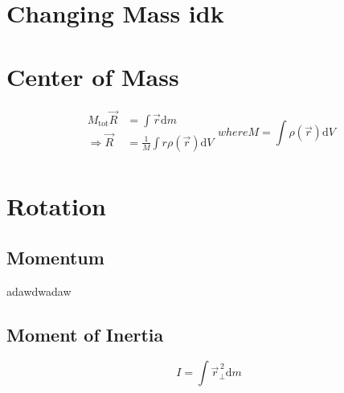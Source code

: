 \documentclass{cheatsheet}
\begin{document}
	\section{Changing Mass idk}
	\section{Center of Mass}
	\begin{subequations}
		\begin{equation*}
			\begin{aligned}
				M_\mathrm{tot}\vec R &= \int \vec r \mathrm{d}m \\
				\Rightarrow \vec{R} &= \frac{1}{M}\int r \rho(\vec{r}) \mathrm{d}V\\
			\end{aligned}
		\end{equation*}
		where
		\begin{equation*}
			M = \int \rho(\vec r) \mathrm{d}V
		\end{equation*}	
	\end{subequations}
	
	\section{Rotation}
		\subsection{Momentum}
			adawdwadaw
		\subsection{Moment of Inertia}
			\begin{subequations}
				\begin{equation*}
					I = \int \vec{r}^{\,2}_\perp \mathrm{d}m
				\end{equation*}
			\end{subequations}
\end{document}
